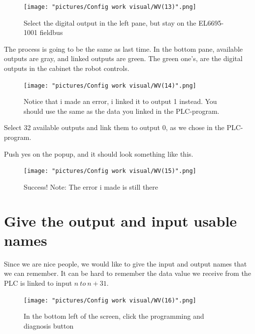 \documentclass{article}
\begin{document}
\begin{figure}[!h]
    \centering
    \texttt{[image: "pictures/Config work visual/WV(13)".png]}
    \caption{Select the digital output in the left pane, but stay on the EL6695-1001 fieldbus }
    \label{fig:my_label}
\end{figure}

\newpage

The process is going to be the same as last time. In the bottom pane, available outputs are gray, and linked outputs are green. The green one's, are the digital outputs in the cabinet the robot controls. 

\begin{figure}[!h]
    \centering
    \texttt{[image: "pictures/Config work visual/WV(14)".png]}
    \caption{Notice that i made an error, i linked it to output 1 instead. You should use the same as the data you linked in the PLC-program.  }
    \label{fig:my_label}
\end{figure}

Select 32 available outputs and link them to output 0, as we chose in the PLC-program.

\newpage

Push yes on the popup, and it should look something like this.

\begin{figure}[!h]
    \centering
    \texttt{[image: "pictures/Config work visual/WV(15)".png]}
    \caption{Success! Note: The error i made is still there}
    \label{fig:my_label}
\end{figure}

\newpage

\section{Give the output and input usable names}
Since we are nice people, we would like to give the input and output names that we can remember. It can be hard to remember the data value we receive from the PLC is linked to input $n\:to\:n+31$. 

\newline
\newline

\begin{figure}[!h]
    \centering
    \texttt{[image: "pictures/Config work visual/WV(16)".png]}
    \caption{In the bottom left of the screen, click the programming and diagnosis button}
    \label{fig:my_label}
\end{figure}
\end{document}
